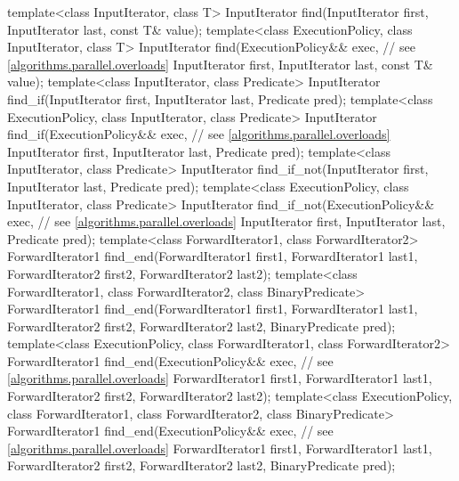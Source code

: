 \begin{codeblock}
{  template<class InputIterator, class T>
    InputIterator find(InputIterator first, InputIterator last,
                       const T& value);
  template<class ExecutionPolicy, class InputIterator, class T>
    InputIterator find(ExecutionPolicy&& exec, // see \ref{algorithms.parallel.overloads}
                       InputIterator first, InputIterator last,
                       const T& value);
  template<class InputIterator, class Predicate>
    InputIterator find_if(InputIterator first, InputIterator last,
                          Predicate pred);
  template<class ExecutionPolicy, class InputIterator, class Predicate>
    InputIterator find_if(ExecutionPolicy&& exec, // see \ref{algorithms.parallel.overloads}
                          InputIterator first, InputIterator last,
                          Predicate pred);
  template<class InputIterator, class Predicate>
    InputIterator find_if_not(InputIterator first, InputIterator last,
                              Predicate pred);
  template<class ExecutionPolicy, class InputIterator, class Predicate>
    InputIterator find_if_not(ExecutionPolicy&& exec, // see \ref{algorithms.parallel.overloads}
                              InputIterator first, InputIterator last,
                              Predicate pred);
  template<class ForwardIterator1, class ForwardIterator2>
    ForwardIterator1
      find_end(ForwardIterator1 first1, ForwardIterator1 last1,
               ForwardIterator2 first2, ForwardIterator2 last2);
  template<class ForwardIterator1, class ForwardIterator2, class BinaryPredicate>
    ForwardIterator1
      find_end(ForwardIterator1 first1, ForwardIterator1 last1,
               ForwardIterator2 first2, ForwardIterator2 last2,
               BinaryPredicate pred);
  template<class ExecutionPolicy, class ForwardIterator1, class ForwardIterator2>
    ForwardIterator1
      find_end(ExecutionPolicy&& exec, // see \ref{algorithms.parallel.overloads}
               ForwardIterator1 first1, ForwardIterator1 last1,
               ForwardIterator2 first2, ForwardIterator2 last2);
  template<class ExecutionPolicy, class ForwardIterator1,
           class ForwardIterator2, class BinaryPredicate>
    ForwardIterator1
      find_end(ExecutionPolicy&& exec, // see \ref{algorithms.parallel.overloads}
               ForwardIterator1 first1, ForwardIterator1 last1,
               ForwardIterator2 first2, ForwardIterator2 last2,
               BinaryPredicate pred);

}
\end{codeblock}
